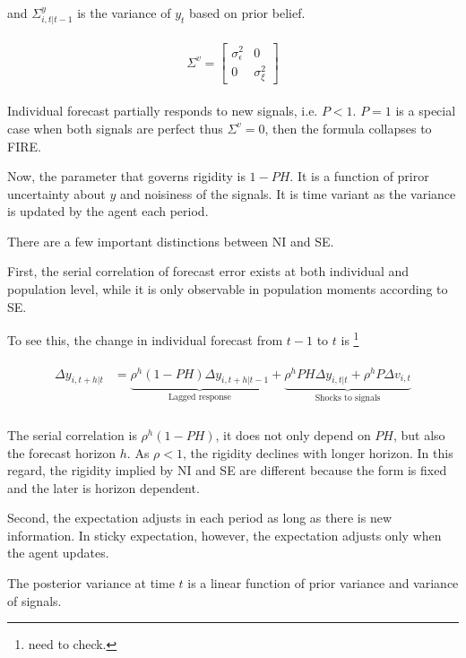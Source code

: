 \documentclass[]{article}
\begin{document}
and $\Sigma^y_{i,t|t-1}$  is the variance of  $y_t$ based on prior belief.

\begin{eqnarray}
\begin{aligned}
 \Sigma^v =  \left[ \begin{matrix} 
  \sigma^2_{\epsilon} &  0 \\ 
  0 & \sigma^2_\xi \end{matrix}\right] 
\end{aligned}
\end{eqnarray}

Individual forecast partially responds to new signals, i.e. $P<1$. $P=1$ is a special case when both signals are perfect thus $\Sigma^v = 0$, then the formula collapses to FIRE. 

Now, the parameter that governs rigidity is $1-PH$. It is a function of priror uncertainty about $y$ and noisiness of the signals. It is time variant as the variance is updated by the agent each period.  

There are a few important distinctions between NI and SE. 

First, the serial correlation of forecast error exists at both individual and population level, while it is only observable in population moments according to SE. 

To see this, the change in individual forecast from $t-1$ to $t$ is \footnote{need to check.}

\begin{eqnarray}
\begin{aligned}
\Delta y_{i,t+h|t} & = \underbrace{\rho^h (1-PH)\Delta y_{i,t+h|t-1}}_{\text{Lagged response}} + \underbrace{\rho^hPH \Delta y_{i,t|t} + \rho^h P\Delta v_{i,t}}_{\text{Shocks to signals}}\\
\end{aligned}
\end{eqnarray}

The serial correlation is $\rho^h(1-PH)$, it does not only depend on $PH$, but also the forecast horizon $h$. As $\rho<1$, the rigidity declines with longer horizon. In this regard, the rigidity implied by NI and SE are different because the form is fixed and the later is horizon dependent.  

Second, the expectation adjusts in each period as long as there is new information. In sticky expectation, however, the expectation adjusts only when the agent updates. 


The posterior variance at time $t$ is a linear function of prior variance and variance of signals. 
\end{document}
